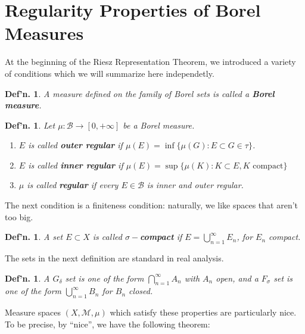 \documentclass[12pt, a4paper]{book}
\newtheorem{definition}[theorem]{Def'n.}
\theoremstyle{nonumberplain}
\begin{document}
\section{Regularity Properties of Borel Measures}
At the beginning of the Riesz Representation Theorem, we introduced a variety of conditions which we will summarize here independetly.
\begin{definition}
    A measure defined on the family of Borel sets is called a \textbf{Borel measure}.
\end{definition}
\begin{definition}
    Let $\mu:\mathcal{B}\to[0,+\infty]$ be a Borel measure.
    \begin{enumerate}[nolistsep]
        \item $E$ is called \textbf{outer regular} if $\mu(E)=\inf\{\mu(G):E\subset G\in\tau\}$.
        \item $E$ is called \textbf{inner regular} if $\mu(E)=\sup\{\mu(K):K\subset E,K\text{ compact}\}$
        \item $\mu$ is called \textbf{regular} if every $E\in\mathcal{B}$ is inner and outer regular.
    \end{enumerate}
\end{definition}
The next condition is a finiteness condition: naturally, we like spaces that aren't too big.
\begin{definition}
    A set $E\subset X$ is called \textbf{$\sigma-$compact} if $E=\bigcup\limits_{n=1}^\infty E_n$, for $E_n$ compact.
\end{definition}
The sets in the next definition are standard in real analysis.
\begin{definition}
    A $G_\delta$ set is one of the form $\bigcap\limits_{n=1}^\infty A_n$ with $A_n$ open, and a $F_\sigma$ set is one of the form $\bigcup\limits_{n=1}^\infty B_n$ for $B_n$ closed.
\end{definition}
Measure spaces $(X,\mathcal{M},\mu)$ which satisfy these properties are particularly nice.
To be precise, by ``nice'', we have the following theorem:
\end{document}
